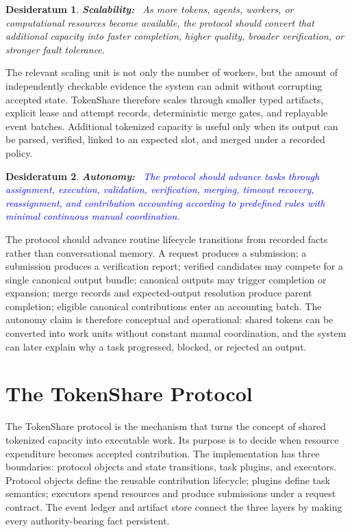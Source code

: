 \documentclass{article}
\theoremstyle{plain}
\newtheorem{desideratum}{Desideratum}
\begin{document}
\begin{desideratum}
\textbf{Scalability:}~ As more tokens, agents, workers, or computational resources become available, the protocol should convert that additional capacity into faster completion, higher quality, broader verification, or stronger fault tolerance.
\end{desideratum}

{\color{blue}
The relevant scaling unit is not only the number of workers, but the amount of independently checkable evidence the system can admit without corrupting accepted state. TokenShare therefore scales through smaller typed artifacts, explicit lease and attempt records, deterministic merge gates, and replayable event batches. Additional tokenized capacity is useful only when its output can be parsed, verified, linked to an expected slot, and merged under a recorded policy.
}


\begin{desideratum}
\textbf{Autonomy:}~ \textcolor{blue}{The protocol should advance tasks through assignment, execution, validation, verification, merging, timeout recovery, reassignment, and contribution accounting according to predefined rules with minimal continuous manual coordination.}
\end{desideratum}

{\color{blue}
The protocol should advance routine lifecycle transitions from recorded facts rather than conversational memory. A request produces a submission; a submission produces a verification report; verified candidates may compete for a single canonical output bundle; canonical outputs may trigger completion or expansion; merge records and expected-output resolution produce parent completion; eligible canonical contributions enter an accounting batch. The autonomy claim is therefore conceptual and operational: shared tokens can be converted into work units without constant manual coordination, and the system can later explain why a task progressed, blocked, or rejected an output.
}



\section{The TokenShare Protocol}

{\color{blue}
The TokenShare protocol is the mechanism that turns the concept of shared tokenized capacity into executable work. Its purpose is to decide when resource expenditure becomes accepted contribution. The implementation has three boundaries: protocol objects and state transitions, task plugins, and executors. Protocol objects define the reusable contribution lifecycle; plugins define task semantics; executors spend resources and produce submissions under a request contract. The event ledger and artifact store connect the three layers by making every authority-bearing fact persistent.
}
\end{document}
